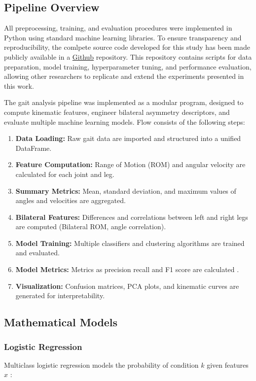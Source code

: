 \documentclass[journal]{IEEEtran}
\begin{document}
\subsection{Pipeline Overview}

All preprocessing, training, and evaluation procedures were implemented in Python using standard machine learning libraries. To ensure transparency and reproducibility, 
the comlpete source code developed for this study has been made publicly available in a \href{https://github.com/lsalamancas/Gait_ML}{Github} repository. This repository contains scripts for data preparation, model training,
hyperparameter tuning, and performance evaluation, allowing other researchers to replicate and extend the experiments presented in this work.

The gait analysis pipeline was implemented as a modular program, designed to compute kinematic features, engineer bilateral asymmetry descriptors,
and evaluate multiple machine learning models. Flow consists of the following steps:

\begin{enumerate}
    \item \textbf{Data Loading:} Raw gait data are imported and structured into a unified DataFrame.
    \item \textbf{Feature Computation:} Range of Motion (ROM) and angular velocity are calculated for each joint and leg.
    \item \textbf{Summary Metrics:} Mean, standard deviation, and maximum values of angles and velocities are aggregated.
    \item \textbf{Bilateral Features:} Differences and correlations between left and right legs are computed (Bilateral ROM, angle correlation).
    \item \textbf{Model Training:} Multiple classifiers and clustering algorithms are trained and evaluated.
    \item \textbf{Model Metrics:} Metrics as precision recall and F1 score are calculated .
    \item \textbf{Visualization:} Confusion matrices, PCA plots, and kinematic curves are generated for interpretability.
\end{enumerate}

\subsection{Mathematical Models}

\subsubsection{Logistic Regression}
Multiclass logistic regression models the probability of condition $k$ given features $x$ \cite{cox1958}:
\end{document}
